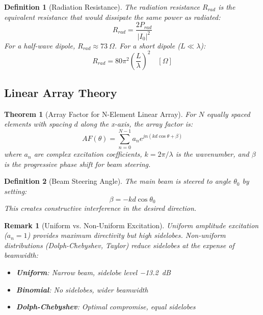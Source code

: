\documentclass[a4paper, 11pt]{article}
\newtheorem{definition}{Definition}[section]
\newtheorem{theorem}{Theorem}[section]
\newtheorem{remark}{Remark}[section]
\begin{document}
\begin{definition}[Radiation Resistance]
The radiation resistance $R_{rad}$ is the equivalent resistance that would dissipate the same power as radiated:
\begin{equation}
R_{rad} = \frac{2P_{rad}}{|I_0|^2}
\end{equation}
For a half-wave dipole, $R_{rad} \approx \SI{73}{\Omega}$. For a short dipole ($L \ll \lambda$):
\begin{equation}
R_{rad} = 80\pi^2\left(\frac{L}{\lambda}\right)^2 \quad [\Omega]
\end{equation}
\end{definition}

\subsection{Linear Array Theory}

\begin{theorem}[Array Factor for N-Element Linear Array]
For $N$ equally spaced elements with spacing $d$ along the x-axis, the array factor is:
\begin{equation}
AF(\theta) = \sum_{n=0}^{N-1} a_n e^{jn(kd\cos\theta + \beta)}
\end{equation}
where $a_n$ are complex excitation coefficients, $k = 2\pi/\lambda$ is the wavenumber, and $\beta$ is the progressive phase shift for beam steering.
\end{theorem}

\begin{definition}[Beam Steering Angle]
The main beam is steered to angle $\theta_0$ by setting:
\begin{equation}
\beta = -kd\cos\theta_0
\end{equation}
This creates constructive interference in the desired direction.
\end{definition}

\begin{remark}[Uniform vs. Non-Uniform Excitation]
Uniform amplitude excitation ($a_n = 1$) provides maximum directivity but high sidelobes. Non-uniform distributions (Dolph-Chebyshev, Taylor) reduce sidelobes at the expense of beamwidth:
\begin{itemize}
\item \textbf{Uniform}: Narrow beam, sidelobe level \SI{-13.2}{dB}
\item \textbf{Binomial}: No sidelobes, wider beamwidth
\item \textbf{Dolph-Chebyshev}: Optimal compromise, equal sidelobes
\end{itemize}
\end{remark}
\end{document}
